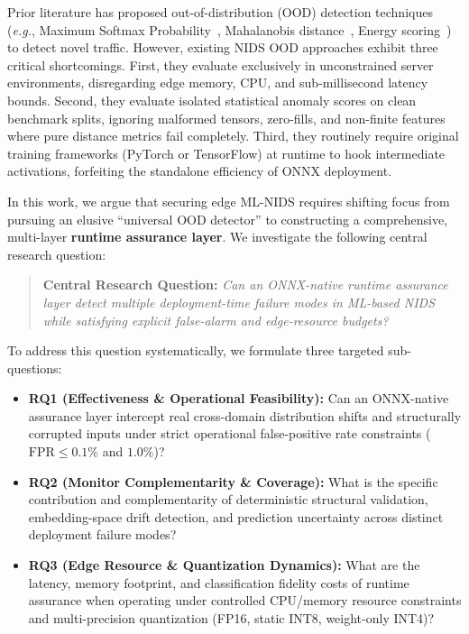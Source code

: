 \documentclass[journal]{IEEEtran}
\newcommand{\eg}{\emph{e.g.}}
\begin{document}
Prior literature has proposed out-of-distribution (OOD) detection techniques (\eg, Maximum Softmax Probability~\cite{hendrycks2017baseline}, Mahalanobis distance~\cite{lee2018mahalanobis}, Energy scoring~\cite{liu2020energy}) to detect novel traffic. However, existing NIDS OOD approaches exhibit three critical shortcomings. First, they evaluate exclusively in unconstrained server environments, disregarding edge memory, CPU, and sub-millisecond latency bounds. Second, they evaluate isolated statistical anomaly scores on clean benchmark splits, ignoring malformed tensors, zero-fills, and non-finite features where pure distance metrics fail completely. Third, they routinely require original training frameworks (PyTorch or TensorFlow) at runtime to hook intermediate activations, forfeiting the standalone efficiency of ONNX deployment.

In this work, we argue that securing edge ML-NIDS requires shifting focus from pursuing an elusive ``universal OOD detector'' to constructing a comprehensive, multi-layer \textbf{runtime assurance layer}. We investigate the following central research question:

\begin{quote}
  \textbf{Central Research Question:} \emph{Can an ONNX-native runtime assurance layer detect multiple deployment-time failure modes in ML-based NIDS while satisfying explicit false-alarm and edge-resource budgets?}
\end{quote}

To address this question systematically, we formulate three targeted sub-questions:
\begin{itemize}[leftmargin=*]
  \item \textbf{RQ1 (Effectiveness \& Operational Feasibility):} Can an ONNX-native assurance layer intercept real cross-domain distribution shifts and structurally corrupted inputs under strict operational false-positive rate constraints ($\text{FPR} \le 0.1\%$ and $1.0\%$)?
  \item \textbf{RQ2 (Monitor Complementarity \& Coverage):} What is the specific contribution and complementarity of deterministic structural validation, embedding-space drift detection, and prediction uncertainty across distinct deployment failure modes?
  \item \textbf{RQ3 (Edge Resource \& Quantization Dynamics):} What are the latency, memory footprint, and classification fidelity costs of runtime assurance when operating under controlled CPU/memory resource constraints and multi-precision quantization (FP16, static INT8, weight-only INT4)?
\end{itemize}
\end{document}
